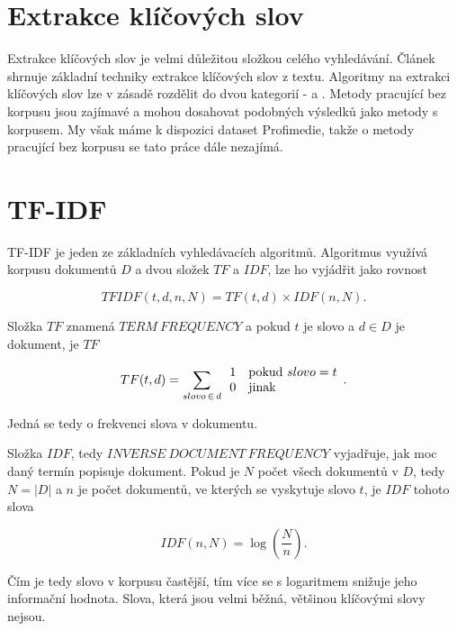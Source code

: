 \section{Extrakce klíčových slov}

Extrakce klíčových slov je velmi důležitou složkou celého vyhledávání. Článek \cite{lott} shrnuje základní techniky extrakce klíčových slov z textu. Algoritmy na extrakci klíčových slov lze v zásadě rozdělit do dvou kategorií -  a . Metody pracující bez korpusu jsou zajímavé a mohou dosahovat podobných výsledků jako metody s korpusem. My však máme k dispozici dataset Profimedie, takže o metody pracující bez korpusu se tato práce dále nezajímá. 

\section{TF-IDF}

TF-IDF je jeden ze základních vyhledávacích algoritmů. Algoritmus využívá korpusu dokumentů $D$ a dvou složek $TF$ a $IDF$, lze ho vyjádřit jako rovnost

\begin{equation}
  TFIDF(t,d,n,N)= TF(t,d)\times IDF(n,N).
\end{equation}

Složka $TF$ znamená $TERM\ FREQUENCY$ a pokud $t$ je slovo a $d \in D$ je dokument, je $TF$

\begin{equation}
 TF(t,d) = \sum_{slovo\,\in\,d} \begin{array}{l l} 1 & \mathrm{pokud}\ slovo = t \\
  0 & \mathrm{jinak} \end{array}.
\end{equation}

Jedná se tedy o frekvenci slova v dokumentu.

Složka $IDF$, tedy $INVERSE\ DOCUMENT\ FREQUENCY$ vyjadřuje, jak moc daný termín popisuje dokument. Pokud je $N$ počet všech dokumentů v $D$, tedy $N = |D|$ a $n$ je počet dokumentů, ve kterých se vyskytuje slovo $t$, je $IDF$ tohoto slova

\begin{equation}
IDF(n,N) = \log \left(\frac{N}{n}\right).
\end{equation}

Čím je tedy slovo v korpusu častější, tím více se s logaritmem snižuje jeho informační hodnota. Slova, která jsou velmi běžná, většinou klíčovými slovy nejsou.

